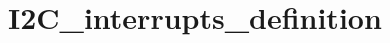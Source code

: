 \hypertarget{group___i2_c__interrupts__definition}{\section{I2\-C\-\_\-interrupts\-\_\-definition}
\label{group___i2_c__interrupts__definition}
}
